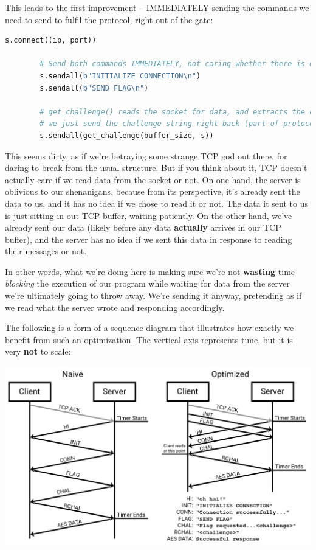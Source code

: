 \documentclass[11pt]{article}
\begin{document}
    This leads to the first improvement -- IMMEDIATELY sending the commands we need to send to fulfil the protocol, right out of the gate:

    \begin{lstlisting}[gobble=8,label={lst:first-efficiency},language=Python]
        s.connect((ip, port))

        # Send both commands IMMEDIATELY, not caring whether there is data to read or not
        s.sendall(b"INITIALIZE CONNECTION\n")
        s.sendall(b"SEND FLAG\n")

        # get_challenge() reads the socket for data, and extracts the challenge string.
        # we just send the challenge string right back (part of protocol)
        s.sendall(get_challenge(buffer_size, s))
    \end{lstlisting}

    This seems dirty, as if we're betraying some strange TCP god out there, for daring to break from the usual structure. But if you think about it, TCP doesn't actually care if we read data from the socket or not. On one hand, the server is oblivious to our shenanigans, because from its perspective, it's already sent the data to us, and it has no idea if we chose to read it or not. The data it sent to us is just sitting in out TCP buffer, waiting patiently. On the other hand, we've already sent our data (likely before any data \textbf{actually} arrives in our TCP buffer), and the server has no idea if we sent this data in response to reading their messages or not.

    In other words, what we're doing here is making sure we're not \textbf{wasting} time \textit{blocking} the execution of our program while waiting for data from the server we're ultimately going to throw away. We're sending it anyway, pretending as if we read what the server wrote and responding accordingly.

    \pagebreak

    The following is a form of a sequence diagram that illustrates how exactly we benefit from such an optimization. The vertical axis represents time, but it is very \textbf{not} to scale:

    \noindent\includegraphics[width=\textwidth]{images/network_diagram}
\end{document}
